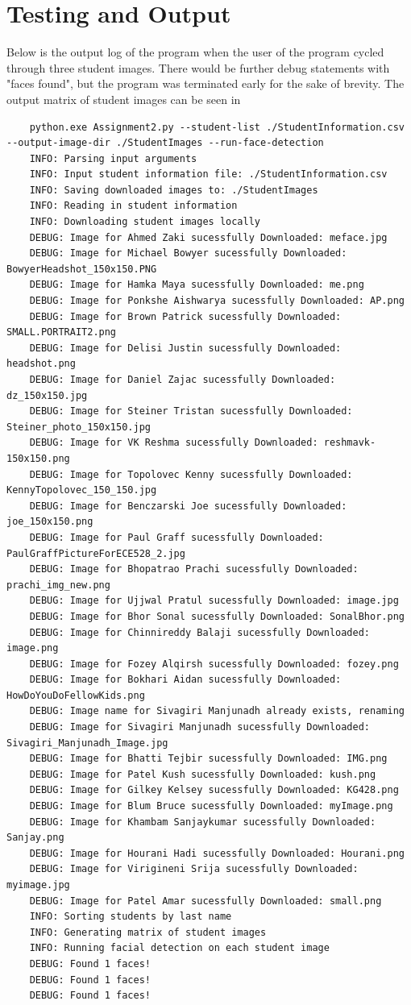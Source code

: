 \documentclass[12pt, letterpaper, final, onecolumn, titlepage] {article}
\begin{document}
\pagebreak
\section{Testing and Output}
Below is the output log of the program when the user of the program cycled through three student images. There would be further debug statements with "faces found", but the program was terminated early for the sake of brevity. The output matrix of student images can be seen in

\singlespacing
\begin{lstlisting}
	python.exe Assignment2.py --student-list ./StudentInformation.csv --output-image-dir ./StudentImages --run-face-detection
	INFO: Parsing input arguments
	INFO: Input student information file: ./StudentInformation.csv
	INFO: Saving downloaded images to: ./StudentImages
	INFO: Reading in student information
	INFO: Downloading student images locally
	DEBUG: Image for Ahmed Zaki sucessfully Downloaded: meface.jpg
	DEBUG: Image for Michael Bowyer sucessfully Downloaded: BowyerHeadshot_150x150.PNG
	DEBUG: Image for Hamka Maya sucessfully Downloaded: me.png
	DEBUG: Image for Ponkshe Aishwarya sucessfully Downloaded: AP.png
	DEBUG: Image for Brown Patrick sucessfully Downloaded: SMALL.PORTRAIT2.png
	DEBUG: Image for Delisi Justin sucessfully Downloaded: headshot.png
	DEBUG: Image for Daniel Zajac sucessfully Downloaded: dz_150x150.jpg
	DEBUG: Image for Steiner Tristan sucessfully Downloaded: Steiner_photo_150x150.jpg
	DEBUG: Image for VK Reshma sucessfully Downloaded: reshmavk-150x150.png
	DEBUG: Image for Topolovec Kenny sucessfully Downloaded: KennyTopolovec_150_150.jpg
	DEBUG: Image for Benczarski Joe sucessfully Downloaded: joe_150x150.png
	DEBUG: Image for Paul Graff sucessfully Downloaded: PaulGraffPictureForECE528_2.jpg
	DEBUG: Image for Bhopatrao Prachi sucessfully Downloaded: prachi_img_new.png
	DEBUG: Image for Ujjwal Pratul sucessfully Downloaded: image.jpg
	DEBUG: Image for Bhor Sonal sucessfully Downloaded: SonalBhor.png
	DEBUG: Image for Chinnireddy Balaji sucessfully Downloaded: image.png
	DEBUG: Image for Fozey Alqirsh sucessfully Downloaded: fozey.png
	DEBUG: Image for Bokhari Aidan sucessfully Downloaded: HowDoYouDoFellowKids.png
	DEBUG: Image name for Sivagiri Manjunadh already exists, renaming
	DEBUG: Image for Sivagiri Manjunadh sucessfully Downloaded: Sivagiri_Manjunadh_Image.jpg
	DEBUG: Image for Bhatti Tejbir sucessfully Downloaded: IMG.png
	DEBUG: Image for Patel Kush sucessfully Downloaded: kush.png
	DEBUG: Image for Gilkey Kelsey sucessfully Downloaded: KG428.png
	DEBUG: Image for Blum Bruce sucessfully Downloaded: myImage.png
	DEBUG: Image for Khambam Sanjaykumar sucessfully Downloaded: Sanjay.png
	DEBUG: Image for Hourani Hadi sucessfully Downloaded: Hourani.png
	DEBUG: Image for Virigineni Srija sucessfully Downloaded: myimage.jpg
	DEBUG: Image for Patel Amar sucessfully Downloaded: small.png
	INFO: Sorting students by last name
	INFO: Generating matrix of student images
	INFO: Running facial detection on each student image
	DEBUG: Found 1 faces!
	DEBUG: Found 1 faces!
	DEBUG: Found 1 faces!	
\end{lstlisting}
\doublespacing
\end{document}
